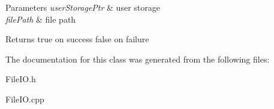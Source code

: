 \begin{DoxyParams}{Parameters}
{\em user\+Storage\+Ptr} & user storage \\
\hline
{\em file\+Path} & file path \\
\hline
\end{DoxyParams}
\begin{DoxyReturn}{Returns}
true on success false on failure 
\end{DoxyReturn}


The documentation for this class was generated from the following files\+:\begin{DoxyCompactItemize}
\item 
File\+I\+O.\+h\item 
File\+I\+O.\+cpp\end{DoxyCompactItemize}
